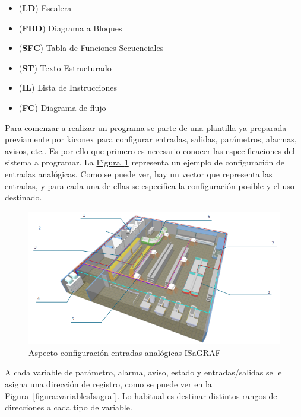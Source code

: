 \begin{itemize}
  \item (\textbf{LD}) Escalera  
  \item (\textbf{FBD}) Diagrama a Bloques 
  \item (\textbf{SFC}) Tabla de Funciones Secuenciales 
  \item (\textbf{ST}) Texto Estructurado 
  \item (\textbf{IL}) Lista de Instrucciones 
  \item (\textbf{FC}) Diagrama de flujo 
\end{itemize}

Para comenzar a realizar un programa se parte de una plantilla ya preparada previamente por kiconex para configurar entradas, salidas, parámetros, alarmas, avisos, etc.. Es por ello que primero es necesario conocer las especificaciones del sistema a programar. La \hyperref[figura:AOisagraf]{Figura~\ref{figura:AOisagraf}} representa un ejemplo de configuración de entradas analógicas. Como se puede ver, hay un vector que representa las entradas, y para cada una de ellas se especifica la configuración posible y el uso destinado.

\begin{figure}[h]
  \centering
  \includegraphics[width=\textwidth, keepaspectratio]{img/planoSupermercado}
  \caption{Aspecto configuración entradas analógicas ISaGRAF}
  \label{figura:AOisagraf}
\end{figure}

A cada variable de parámetro, alarma, aviso, estado y entradas/salidas se le asigna una dirección de registro, como se puede ver en la \hyperref[figura:variablesIsagraf]{Figura~\ref{figura:variablesIsagraf}}. Lo habitual es destinar distintos rangos de direcciones a cada tipo de variable.

